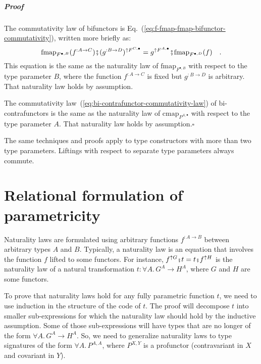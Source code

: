 \subparagraph{Proof}

The commutativity law of bifunctors is Eq.~(\ref{eq:f-fmap-fmap-bifunctor-commutativity}),
written more briefly as:
\[
\text{fmap}_{F^{\bullet,B}}(f^{:A\rightarrow C})\bef(g^{:B\rightarrow D})^{\uparrow F^{C,\bullet}}=g^{\uparrow F^{A,\bullet}}\bef\text{fmap}_{F^{\bullet,D}}(f)\quad.
\]
This equation is the same as the naturality law of $\text{fmap}_{F^{\bullet,B}}$
with respect to the type parameter $B$, where the function $f^{:A\rightarrow C}$
is fixed but $g^{:B\rightarrow D}$ is arbitrary. That naturality
law holds by assumption.

The commutativity law~(\ref{eq:bi-contrafunctor-commutativity-law})
of bi-contrafunctors is the same as the naturality law of $\text{cmap}_{P^{A,\bullet}}$
with respect to the type parameter $A$. That naturality law holds
by assumption.$\square$

The same techniques and proofs apply to type constructors with more
than two type parameters. Liftings with respect to separate type
parameters always commute.

\section{Relational formulation of parametricity\label{sec:Parametricity-theorem-for-relations}\label{subsec:Relations-between-types}}

Naturality laws are formulated using arbitrary functions $f^{:A\rightarrow B}$
between arbitrary types $A$ and $B$. Typically, a naturality law
is an equation that involves the function $f$ lifted to some functors.
For instance, $f^{\uparrow G}\bef t=t\bef f^{\uparrow H}$ is the
naturality law of a natural transformation $t:\forall A.\,G^{A}\rightarrow H^{A}$,
where $G$ and $H$ are some functors.

To prove that naturality laws hold for any fully parametric function
$t$, we need to use induction in the structure of the code of $t$.
The proof will decompose $t$ into smaller sub-expressions for which
the naturality law should hold by the inductive assumption. Some of
those sub-expressions will have types that are no longer of the form
$\forall A.\,G^{A}\rightarrow H^{A}$. So, we need to generalize naturality
laws to type signatures of the form $\forall A.\,P^{A,A}$, where
$P^{X,Y}$ is a profunctor (contravariant in $X$ and covariant in
$Y$). 

